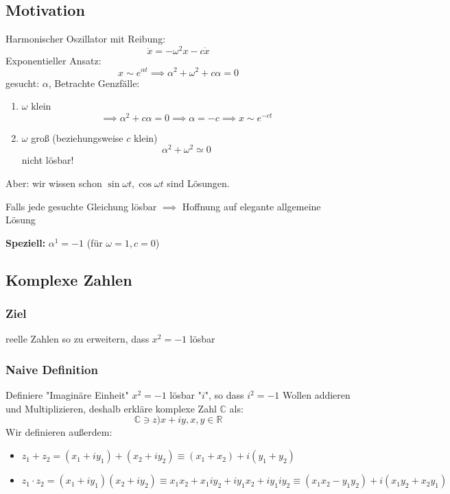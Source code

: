 \documentclass[a4paper]{scrartcl}
\theoremstyle{definition}
\theoremstyle{plain}
\theoremstyle{remark}
\theoremstyle{remark}
\newcommand{\I}{\ensuremath{i}}%
\begin{document}
\subsection*{Motivation}
   Harmonischer Oszillator mit Reibung:
   \[\ddot{x} = -\omega^2 x - c \dot{x}\]
   Exponentieller Ansatz:
   \[x\sim e^{\alpha t} \implies \alpha^2 + \omega^2 + c\alpha = 0\]
   gesucht: $\alpha$, Betrachte Genzfälle:
\begin{enumerate}
\item $\omega$ klein
\[\implies \alpha^2 + c\alpha = 0 \implies \alpha = -c \implies x\sim e^{-c t}\]
\item $\omega$ groß (beziehungsweise $c$ klein)
\[\alpha^2 + \omega^2 \simeq 0\]
nicht lösbar!
\end{enumerate}
Aber: wir wissen schon $\sin{\omega t}, \cos{\omega t}$ sind Lösungen.

Falls jede gesuchte Gleichung lösbar $\implies$ Hoffnung auf elegante allgemeine Lösung

\textbf{Speziell:} $\alpha^1 = -1$ (für $\omega = 1, c = 0$)
\subsection{Komplexe Zahlen}
\label{sec-5-1}
\subsubsection{Ziel}
\label{sec-5-1-1}
reelle Zahlen so zu erweitern, dass $x^2 = - 1$ lösbar
\subsubsection{Naive Definition}
\label{sec-5-1-2}
Definiere "Imaginäre Einheit" $x^2 = -1$ lösbar "$\I$", so dass $\I^2 = -1$
Wollen addieren und Multiplizieren, deshalb erkläre komplexe Zahl $\mathbb{C}$ als:
\[\mathbb{C} \ni z ) x + \I y, x,y\in\mathbb{R}\]
Wir definieren außerdem:
\begin{itemize}
\item $z_1 + z_2 = (x_1 + \I y_1) + (x_2 + \I y_2) \equiv (x_1 + x_2) + \I(y_1 + y_2)$
\item $z_1 \cdot z_2 = (x_1 + \I y_1) (x_2 + \I y_2) \equiv x_1 x_2 + x_1 \I y_2 + \I y_1 x_2 + \I y_1 \I y_2 \equiv (x_1 x_2 - y_1 y_2) + i(x_1 y_2 + x_2 y_1)$
\end{itemize}
\end{document}
